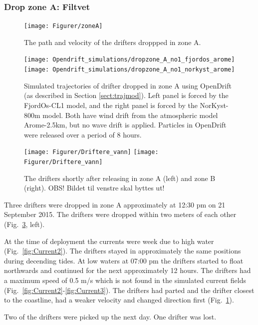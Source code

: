 \documentclass[12pt,a4paper,english]{article}
\begin{document}
\subsubsection{Drop zone A: Filtvet}
%
\begin{figure}[ht]
\centerline{
\texttt{[image: Figurer/zoneA]}}
\caption{\small
The path and velocity of the drifters droppped in zone A.%
}
\label{fig:ZoneA}
\end{figure}
%
\begin{figure}[ht]
\centerline{
\texttt{[image: Opendrift\_simulations/dropzone\_A\_no1\_fjordos\_arome]}
\texttt{[image: Opendrift\_simulations/dropzone\_A\_no1\_norkyst\_arome]}
}
\caption{\small
Simulated trajectories of drifter dropped in zone A using OpenDrift (as described in Section \ref{sect:trajmod}). Left panel is forced by the FjordOs-CL1 model, and the right panel is forced by the NorKyst-800m model. Both have wind drift from the atmospheric model Arome-2.5km, but no wave drift is applied. Particles in OpenDrift were released over a period of 8 hours.
}
\label{fig:opendriftA}
\end{figure}
%
\begin{figure}[ht]
\centerline{
\texttt{[image: Figurer/Driftere\_vann]}
\texttt{[image: Figurer/Driftere\_vann]}
}
\caption{\small
The drifters shortly after releasing in zone A (left) and zone B (right). OBS! Bildet til venstre skal byttes ut!
}
\label{fig:DriftereVann}
\end{figure}

Three drifters were dropped in zone A approximately at 12:30 pm on 21 September 2015. The drifters were dropped within two meters of each other (Fig.~\ref{fig:DriftereVann}, left).

At the time of deployment the currents were week due to high water (Fig.~\ref{fig:Current2}). The drifters stayed in approximately the same positions during decending tides. At low waters at 07:00 pm the drifters started to float northwards and continued for the next approximately 12 hours. The drifters had a maximum speed of 0.5 m/s which is not found in the simulated current fields (Fig.~\ref{fig:Current2}-\ref{fig:Current3}). The drifters had parted and the drifter closest to the coastline, had a weaker velocity and changed direction first (Fig.~\ref{fig:ZoneA}). 

Two of the drifters were picked up the next day. One drifter was lost. 
\end{document}
